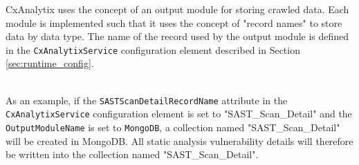 CxAnalytix uses the concept of an output module for storing crawled data.  Each module is implemented such that it uses the concept of "record names" 
to store data by data type.  The name of the record used by the output module is defined in the \texttt{CxAnalytixService} configuration element described
in Section \ref{sec:runtime_config}.

\noindent\\As an example, if the \texttt{SASTScanDetailRecordName} attribute in the \texttt{CxAnalytixService} configuration element is set to
"SAST\_Scan\_Detail" and the \texttt{OutputModuleName} is set to \texttt{MongoDB}, a collection named "SAST\_Scan\_Detail" will be created in MongoDB.
All static analysis vulnerability details will therefore be written into the collection named "SAST\_Scan\_Detail".







